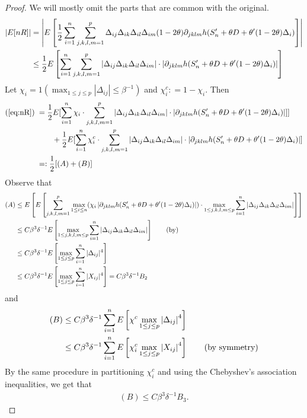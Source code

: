 \documentclass{article}
\begin{document}
\begin{proof}
     We will mostly omit the parts that are common with the original.
    \begin{align}\label{eq:nR}
        \abs{E[ nR ]} &= \left| E \left[ \frac{1}{2} \sum_{i=1}^n  \sum_{j,k,l,m=1}^p \Delta_{ij} \Delta_{ik} \Delta_{il} \Delta_{im} ( 1 - 2 \theta )  \partial_{ jklm} h ( S_n' + \theta D +  \theta  ' ( 1 - 2 \theta) \Delta_i )\right]\right| \\
        &\leq  \frac{1}{2} E \left[  \sum_{i=1}^n  \sum_{j,k,l,m=1}^p \left|\Delta_{ij} \Delta_{ik} \Delta_{il} \Delta_{im}\right| \cdot \left|\partial_{ jklm} h ( S_n' + \theta D +  \theta  ' ( 1 - 2 \theta) \Delta_i )\right|\right]
    \end{align}
        Let $\chi_i = 1( \max_{1 \leq j \leq p} | \Delta_{ij} | \leq \beta^{-1})  $ and $ \chi_i^c : = 1 - \chi_i $. Then
        \begin{align*}
            (\ref{eq:nR}) \;&= \frac{1}{2}E[ \sum_{i=1}^n \chi_i \cdot    \sum_{j,k,l,m=1}^p |\Delta_{ij} \Delta_{ik} \Delta_{il} \Delta_{im} | \cdot | \partial_{ jklm} h ( S_n' + \theta D +  \theta  ' ( 1 - 2 \theta) \Delta_i )| ]]\\
            &\qquad+ \frac{ 1}{2} E [ \sum_{i=1}^n \chi_i^c \cdot   \sum_{j,k,l,m=1}^p |\Delta_{ij} \Delta_{ik} \Delta_{il} \Delta_{im} | \cdot | \partial_{ jklm} h ( S_n' + \theta D +  \theta  ' ( 1 - 2 \theta) \Delta_i )| ]\\
            &=: \frac{1}{2} [ (A)+ (B)]
        \end{align*}
        Observe that 
        \begin{align*}
            (A)&\leq E\left[ E \left[   \sum_{j,k,l,m=1}^p  \max_{1 \leq i \leq n }( \chi_i \left| \partial_{ jklm} h ( S_n' + \theta D +  \theta  ' ( 1 - 2 \theta) \Delta_i ) \right|)\cdot\max_{ 1\leq j,k,l,m \leq p}\sum_{i=1}^n \abs{\Delta_{ij} \Delta_{ik} \Delta_{il} \Delta_{im}} \right]\right]\\
            &\leq C \beta ^3 \delta ^{-1} E\left[ \max_{ 1 \leq j , k,l,m\leq p}\sum_{i=1}^n \abs{\Delta_{ij} \Delta_{ik} \Delta_{il} \Delta_{im}} \right]  \qquad( \text{by} )\\
            &\leq C \beta ^3 \delta ^{-1} E \left[ \max _{ 1 \leq j \leq p } \sum_{i=1}^n | \Delta_{ij}|^4\right] \\
            &\leq C \beta ^3 \delta ^{-1} E\left[ \max _{ 1 \leq j \leq p } \sum_{i=1}^n | X_{ij}|^4\right] = C \beta ^3 \delta ^{-1} B_2
        \end{align*}
    and
    \begin{align*}
        (B)&\leq C \beta^3 \delta^{-1} \sum _{i=1}^n E\left[ \chi^c  \max_{1 \leq j \leq p} \abs{\Delta_{ij}}^4\right] \\
        &\leq C \beta^3 \delta^{-1} \sum_{i=1}^n E\left[ \chi_i^c \max_{ 1 \leq j \leq p} \abs{X_{ij}}^4\right]\qquad(\text{by symmetry})
    \end{align*}
    By the same procedure in \cite{cite cher supr} partitioning $\chi_i^c$ and using the Chebyshev's association inequalities, we get that 
    \begin{align*}
        (B) \leq C \beta^3 \delta^{-1} B_3.
    \end{align*}
    

\end{proof}
\end{document}
